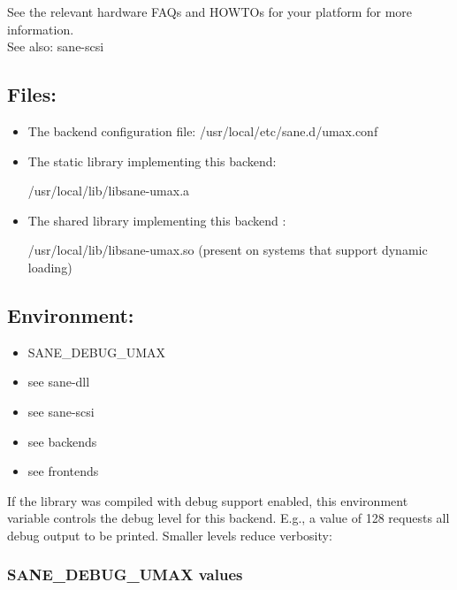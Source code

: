 See the relevant hardware FAQs and HOWTOs for your platform for more information.\\


See also: sane-scsi




\subsection{Files:}

\begin{itemize}
\item The backend configuration file: /usr/local/etc/sane.d/umax.conf
\item The static library implementing this backend:

/usr/local/lib/libsane-umax.a
\item The shared library implementing this backend :

/usr/local/lib/libsane-umax.so
(present on systems that support dynamic loading)
\end{itemize}





\subsection{Environment:}



\begin{itemize}
\item SANE\_DEBUG\_UMAX
\item see sane-dll
\item see sane-scsi
\item see backends
\item see frontends
\end{itemize}


If the library was compiled with debug support enabled, this environment
variable controls the debug level for this backend. E.g., a value of 128
requests all debug output to be printed. Smaller levels reduce verbosity:




\subsubsection{SANE\_DEBUG\_UMAX values}

